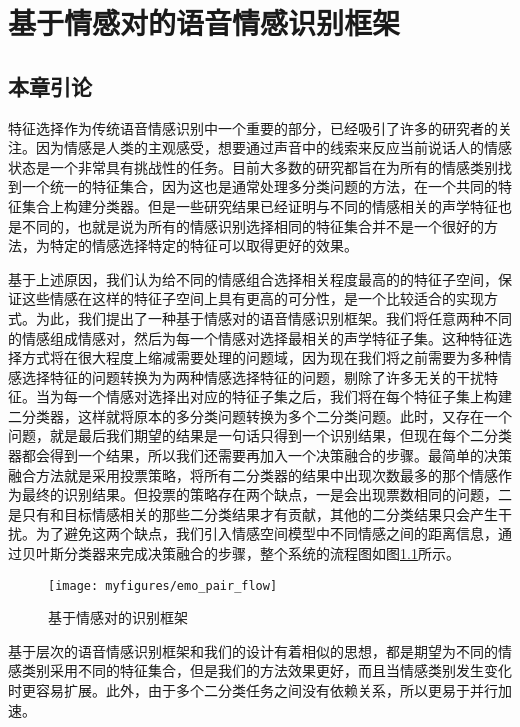 \chapter{基于情感对的语音情感识别框架}
\label{cha:emo_pair_base_framework}

\section{本章引论}
\label{sec:emo_pair_base_framework_intro}
特征选择作为传统语音情感识别中一个重要的部分，已经吸引了许多的研究者的关注。因为情感是人类的主观感受，想要通过声音中的线索来反应当前说话人的情感状态是一个非常具有挑战性的任务。目前大多数的研究都旨在为所有的情感类别找到一个统一的特征集合，因为这也是通常处理多分类问题的方法，在一个共同的特征集合上构建分类器。但是一些研究结果已经证明与不同的情感相关的声学特征也是不同的，也就是说为所有的情感识别选择相同的特征集合并不是一个很好的方法，为特定的情感选择特定的特征可以取得更好的效果。

基于上述原因，我们认为给不同的情感组合选择相关程度最高的的特征子空间，保证这些情感在这样的特征子空间上具有更高的可分性，是一个比较适合的实现方式。为此，我们提出了一种基于情感对的语音情感识别框架。我们将任意两种不同的情感组成情感对，然后为每一个情感对选择最相关的声学特征子集。这种特征选择方式将在很大程度上缩减需要处理的问题域，因为现在我们将之前需要为多种情感选择特征的问题转换为为两种情感选择特征的问题，剔除了许多无关的干扰特征。当为每一个情感对选择出对应的特征子集之后，我们将在每个特征子集上构建二分类器，这样就将原本的多分类问题转换为多个二分类问题。此时，又存在一个问题，就是最后我们期望的结果是一句话只得到一个识别结果，但现在每个二分类器都会得到一个结果，所以我们还需要再加入一个决策融合的步骤。最简单的决策融合方法就是采用投票策略，将所有二分类器的结果中出现次数最多的那个情感作为最终的识别结果。但投票的策略存在两个缺点，一是会出现票数相同的问题，二是只有和目标情感相关的那些二分类结果才有贡献，其他的二分类结果只会产生干扰。为了避免这两个缺点，我们引入情感空间模型中不同情感之间的距离信息，通过贝叶斯分类器来完成决策融合的步骤，整个系统的流程图如图\ref{fig:emo_pair_flow}所示。

\begin{figure}[htb] %
    \centering
    \texttt{[image: myfigures/emo\_pair\_flow]}
    \caption{基于情感对的识别框架}
    \label{fig:emo_pair_flow}
\end{figure}

基于层次的语音情感识别框架和我们的设计有着相似的思想，都是期望为不同的情感类别采用不同的特征集合，但是我们的方法效果更好，而且当情感类别发生变化时更容易扩展。此外，由于多个二分类任务之间没有依赖关系，所以更易于并行加速。

